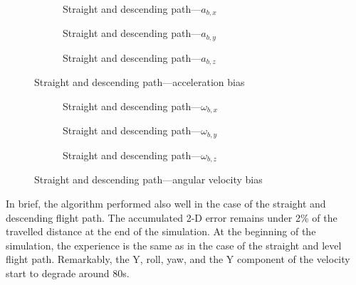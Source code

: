 \begin{figure}[H]
    \centering
    \begin{subfigure}{0.3\textwidth}
        
        \caption{Straight and descending path---$a_{b,x}$}
    \end{subfigure}
    \hfill
    \begin{subfigure}{0.3\textwidth}
        
        \caption{Straight and descending path---$a_{b,y}$}
    \end{subfigure}
    \hfill
    \begin{subfigure}{0.3\textwidth}
        
        \caption{Straight and descending path---$a_{b,z}$}
    \end{subfigure}
    \caption{Straight and descending path---acceleration bias}\label{fig:straight-descending-abias}
\end{figure}

\begin{figure}[H]
    \centering
    \begin{subfigure}{0.3\textwidth}
        
        \caption{Straight and descending path---$\omega_{b,x}$}
    \end{subfigure}
    \hfill
    \begin{subfigure}{0.3\textwidth}
        
        \caption{Straight and descending path---$\omega_{b,y}$}
    \end{subfigure}
    \hfill
    \begin{subfigure}{0.3\textwidth}
        
        \caption{Straight and descending path---$\omega_{b,z}$}
    \end{subfigure}
    \caption{Straight and descending path---angular velocity bias}\label{fig:straight-descending-wbias}
\end{figure}

In brief, the algorithm performed also well in the case of the straight and descending flight path. The accumulated 2-D error remains under 2\% of the travelled distance at the end of the simulation. At the beginning of the simulation, the experience is the same as in the case of the straight and level flight path. Remarkably, the Y, roll, yaw, and the Y component of the velocity start to degrade around 80\si{\second}.

